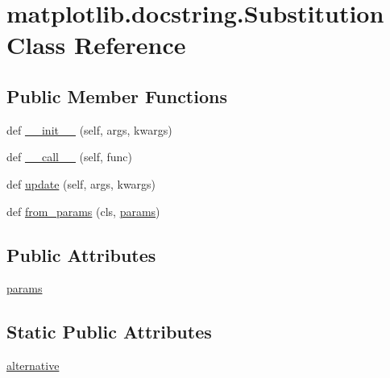 \hypertarget{classmatplotlib_1_1docstring_1_1Substitution}{}\section{matplotlib.\+docstring.\+Substitution Class Reference}
\label{classmatplotlib_1_1docstring_1_1Substitution}
\subsection*{Public Member Functions}
\begin{DoxyCompactItemize}
\item 
def \hyperlink{classmatplotlib_1_1docstring_1_1Substitution_ab8010fcdd00dcc7c88a90748d4c37d4f}{\+\_\+\+\_\+init\+\_\+\+\_\+} (self, args, kwargs)
\item 
def \hyperlink{classmatplotlib_1_1docstring_1_1Substitution_a2a8935759c15e4ab7e37013f629af793}{\+\_\+\+\_\+call\+\_\+\+\_\+} (self, func)
\item 
def \hyperlink{classmatplotlib_1_1docstring_1_1Substitution_a8aee3f1be589a772f2751ab2a7eb6e8b}{update} (self, args, kwargs)
\item 
def \hyperlink{classmatplotlib_1_1docstring_1_1Substitution_ae0175a2e7b63a4e787b37dce1587d5fd}{from\+\_\+params} (cls, \hyperlink{classmatplotlib_1_1docstring_1_1Substitution_af427316b5e8f50e6458018c5c0ea2d18}{params})
\end{DoxyCompactItemize}
\subsection*{Public Attributes}
\begin{DoxyCompactItemize}
\item 
\hyperlink{classmatplotlib_1_1docstring_1_1Substitution_af427316b5e8f50e6458018c5c0ea2d18}{params}
\end{DoxyCompactItemize}
\subsection*{Static Public Attributes}
\begin{DoxyCompactItemize}
\item 
\hyperlink{classmatplotlib_1_1docstring_1_1Substitution_a276f9c722ef3324ff1c94800e0dc3759}{alternative}
\end{DoxyCompactItemize}


